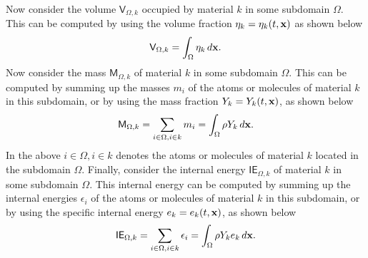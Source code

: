 \documentclass[a4paper,11pt]{report}
\begin{document}
Now consider the volume $\mathsf{V}_{\Omega,k}$ occupied by material $k$ in some subdomain $\Omega$. This can be computed by using the volume fraction $\eta_k = \eta_k(t,\mathbf{x})$ as shown below
\begin{equation}
    \mathsf{V}_{\Omega,k} = \int_\Omega \eta_k \, d\mathbf{x}.
\end{equation}
Now consider the mass $\mathsf{M}_{\Omega,k}$ of material $k$ in some subdomain $\Omega$. This can be computed by summing up the masses $m_i$ of the atoms or molecules of material $k$ in this subdomain, or by using the mass fraction $Y_k = Y_k(t,\mathbf{x})$, as shown below 
\begin{equation}
    \mathsf{M}_{\Omega,k} = \sum_{i \in \Omega, i \in k} m_i = \int_\Omega \rho Y_k \, d\mathbf{x}.
\end{equation}
In the above $i \in \Omega, i \in k$ denotes the atoms or molecules of material $k$ located in the subdomain $\Omega$. Finally, consider the internal energy $\mathsf{IE}_{\Omega,k}$ of material $k$ in some subdomain $\Omega$. This internal energy can be computed by summing up the internal energies $\epsilon_i$ of the atoms or molecules of material $k$ in this subdomain, or by using the specific internal energy $e_k = e_k(t,\mathbf{x})$, as shown below
\begin{equation}
    \mathsf{IE}_{\Omega,k} = \sum_{i \in \Omega, i \in k} \epsilon_i = \int_\Omega \rho Y_k e_k \, d\mathbf{x}.
\end{equation}
\end{document}

